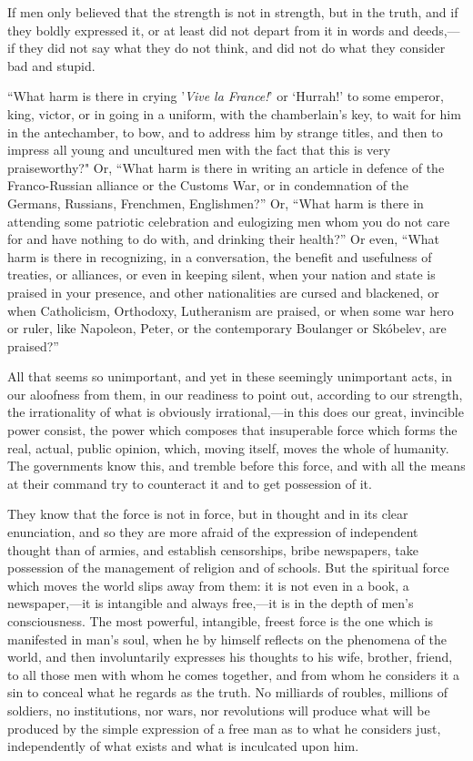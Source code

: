 \documentclass{book}
\begin{document}
If men only believed that the strength is not in strength, but in the truth, and if they boldly expressed it, or at least did not depart from it in words and deeds,—if they did not say what they do not think, and did not do what they consider bad and stupid.

“What harm is there in crying '\emph{Vive la France!}' or ‘Hurrah!’ to some emperor, king, victor, or in going in a uniform, with the chamberlain’s key, to wait for him in the antechamber, to bow, and to address him by strange titles, and then to impress all young and uncultured men with the fact that this is very praiseworthy?" Or, “What harm is there in writing an article in defence of the Franco-Russian alliance or the Customs War, or in condemnation of the Germans, Russians, Frenchmen, Englishmen?” Or, “What harm is there in attending some patriotic celebration and eulogizing men whom you do not care for and have nothing to do with, and drinking their health?” Or even, “What harm is there in recognizing, in a conversation, the benefit and usefulness of treaties, or alliances, or even in keeping silent, when your nation and state is praised in your presence, and other nationalities are cursed and blackened, or when Catholicism, Orthodoxy, Lutheranism are praised, or when some war hero or ruler, like Napoleon, Peter, or the contemporary Boulanger or Skóbelev, are praised?”

All that seems so unimportant, and yet in these seemingly unimportant acts, in our aloofness from them, in our readiness to point out, according to our strength, the irrationality of what is obviously irrational,—in this does our great, invincible power consist, the power which composes that insuperable force which forms the real, actual, public opinion, which, moving itself, moves the whole of humanity. The governments know this, and tremble before this force, and with all the means at their command try to counteract it and to get possession of it.

They know that the force is not in force, but in thought and in its clear enunciation, and so they are more afraid of the expression of independent thought than of armies, and establish censorships, bribe newspapers, take possession of the management of religion and of schools. But the spiritual force which moves the world slips away from them: it is not even in a book, a newspaper,—it is intangible and always free,—it is in the depth of men’s consciousness. The most powerful, intangible, freest force is the one which is manifested in man’s soul, when he by himself reflects on the phenomena of the world, and then involuntarily expresses his thoughts to his wife, brother, friend, to all those men with whom he comes together, and from whom he considers it a sin to conceal what he regards as the truth. No milliards of roubles, millions of soldiers, no institutions, nor wars, nor revolutions will produce what will be produced by the simple expression of a free man as to what he considers just, independently of what exists and what is inculcated upon him.
\end{document}
